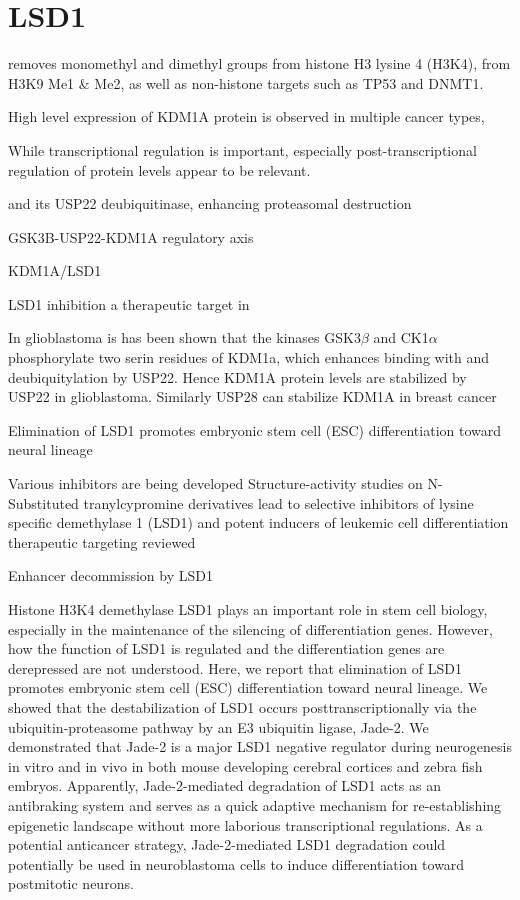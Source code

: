 \section{LSD1}

 removes monomethyl and dimethyl groups from histone H3 lysine 4 (H3K4)\cite{Shi2004}, from H3K9 Me1 \& Me2, as well as non-histone targets such as TP53 and DNMT1.
 
 High level expression of KDM1A protein is observed in multiple cancer types,
 
 While transcriptional regulation is important, especially post-transcriptional regulation of protein levels appear to be relevant. 
 
 and its USP22 deubiquitinase, enhancing proteasomal destruction
 
 GSK3B-USP22-KDM1A regulatory axis 

KDM1A/LSD1\cite{Harris2012}

LSD1 inhibition a therapeutic target in \cite{Cusan2018}

In glioblastoma is has been shown that the kinases GSK3$\beta$ and CK1$\alpha$ phosphorylate two serin residues of KDM1a, which enhances binding with and deubiquitylation by USP22. Hence KDM1A protein levels are stabilized by USP22 in glioblastoma\cite{Zhou2016}. Similarly USP28 can stabilize KDM1A in breast cancer \cite{Wu2013} 

Elimination of LSD1 promotes embryonic stem cell (ESC) differentiation toward neural lineage \cite{Han2014} 


Various inhibitors are being developed \cite{Mould2017,Schulz-Fincke2018}
Structure-activity studies on N-Substituted tranylcypromine derivatives lead to selective inhibitors of lysine specific demethylase 1 (LSD1) and potent inducers of leukemic cell differentiation\cite{Schulz-Fincke2018}
therapeutic targeting reviewed\cite{Maiques-Diaz2016}

Enhancer decommission by LSD1\cite{Whyte2012}



Histone H3K4 demethylase LSD1 plays an important role in stem cell biology, especially in the maintenance of the silencing of differentiation genes. However, how the function of LSD1 is regulated and the differentiation genes are derepressed are not understood. Here, we report that elimination of LSD1 promotes embryonic stem cell (ESC) differentiation toward neural lineage. We showed that the destabilization of LSD1 occurs posttranscriptionally via the ubiquitin-proteasome pathway by an E3 ubiquitin ligase, Jade-2. We demonstrated that Jade-2 is a major LSD1 negative regulator during neurogenesis in vitro and in vivo in both mouse developing cerebral cortices and zebra fish embryos. Apparently, Jade-2-mediated degradation of LSD1 acts as an antibraking system and serves as a quick adaptive mechanism for re-establishing epigenetic landscape without more laborious transcriptional regulations. As a potential anticancer strategy, Jade-2-mediated LSD1 degradation could potentially be used in neuroblastoma cells to induce differentiation toward postmitotic neurons.\cite{Han2014}


